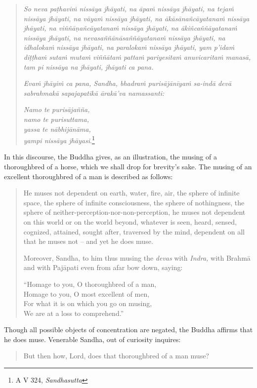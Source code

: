 \begin{quote}
\emph{So neva paṭhaviṁ nissāya jhāyati, na āpaṁ nissāya jhāyati, na tejaṁ nissāya jhāyati, na vāyaṁ nissāya jhāyati, na ākāsānañcāyatanaṁ nissāya jhāyati, na viññāṇañcāyatanaṁ nissāya jhāyati, na ākiñcaññāyatanaṁ nissāya jhāyati, na nevasaññānāsaññāyatanaṁ nissāya jhāyati, na idhalokaṁ nissāya jhāyati, na paralokaṁ nissāya jhāyati, yam p'idaṁ diṭṭhaṁ sutaṁ mutaṁ viññātaṁ pattaṁ pariyesitaṁ anuvicaritaṁ manasā, tam pi nissāya na jhāyati, jhāyati ca pana.}

\emph{Evaṁ jhāyiṁ ca pana, Sandha, bhadraṁ purisājānīyaṁ sa-indā devā sabrahmakā sapajapatikā ārakā'va namassanti:}

\emph{Namo te purisājañña,}\\
\emph{namo te purisuttama,}\\
\emph{yassa te nābhijānāma,}\\
\emph{yampi nissāya jhāyasi}.\footnote{A V 324, \emph{Sandhasutta}}
\end{quote}

In this discourse, the Buddha gives, as an illustration, the musing of a thoroughbred of a horse, which we shall drop for brevity's sake. The musing of an excellent thoroughbred of a man is described as follows:

\begin{quote}
He muses not dependent on earth, water, fire, air, the sphere of infinite space, the sphere of infinite consciousness, the sphere of nothingness, the sphere of neither-perception-nor-non-perception, he muses not dependent on this world or on the world beyond, whatever is seen, heard, sensed, cognized, attained, sought after, traversed by the mind, dependent on all that he muses not -- and yet he does muse.

Moreover, Sandha, to him thus musing the \emph{devas} with \emph{Indra,} with Brahmā and with Pajāpati even from afar bow down, saying:

``Homage to you, O thoroughbred of a man,\\
Homage to you, O most excellent of men,\\
For what it is on which you go on musing,\\
We are at a loss to comprehend.''
\end{quote}

Though all possible objects of concentration are negated, the Buddha affirms that he does muse. Venerable Sandha, out of curiosity inquires:

\begin{quote}
But then how, Lord, does that thoroughbred of a man muse?
\end{quote}

